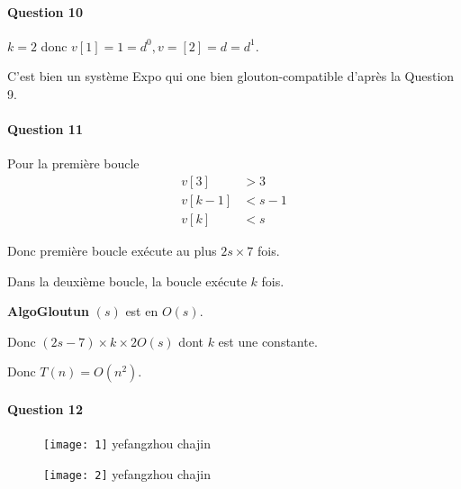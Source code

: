 \documentclass{article}
\begin{document}
\paragraph{Question 10}
$k=2$ donc $v[1]=1=d^0, v =[2]=d=d^1$.

C'est bien un système Expo qui one bien glouton-compatible d'après la Question 9.
\paragraph{Question 11}
Pour la première boucle 
\begin{align*}
v[3] &>3\\v[k-1] &< s-1\\v[k] &<s
\end{align*}

Donc première boucle exécute au plus $2s \times 7$ fois.

Dans la deuxième boucle, la boucle exécute $k$ fois.

\textbf{AlgoGloutun} $(s)$ est en $O(s)$.

Donc $(2s-7) \times k \times 2O(s)$ dont $k$ est une constante.

Donc $T(n) = O(n^2)$.
\paragraph{Question 12}

\begin{figure}[!b]
   \center\texttt{[image: 1]}
   \center yefangzhou chajin
\end{figure}
\newpage
\begin{figure}[!h]
 \center\texttt{[image: 2]}
   \center yefangzhou chajin
\end{figure}
\end{document}
